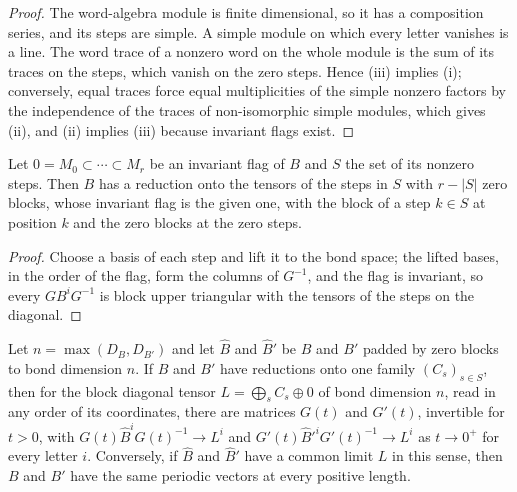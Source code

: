 \begin{proof}
    \leanok
    The word-algebra module is finite dimensional, so it has a composition
    series, and its steps are simple. A simple module on which every letter
    vanishes is a line. The word trace of a nonzero word on the whole module
    is the sum of its traces on the steps, which vanish on the zero steps.
    Hence (iii) implies (i); conversely, equal traces force equal
    multiplicities of the simple nonzero factors by the independence of
    the traces of non-isomorphic simple modules, which gives (ii), and (ii)
    implies (iii) because invariant flags exist.
\end{proof}

\begin{lemma}
    \label{thm:asym_arbitrary_flag_reduction}
    \leanok
    Let $0=M_0\subset\cdots\subset M_r$ be an invariant flag of $B$ and $S$
    the set of its nonzero steps. Then $B$ has a reduction onto the tensors of
    the steps in $S$ with $r-|S|$ zero blocks, whose invariant flag is the
    given one, with the block of a step $k\in S$ at position $k$ and the zero
    blocks at the zero steps.
\end{lemma}

\begin{proof}
    \leanok
    Choose a basis of each step and lift it to the bond space; the lifted
    bases, in the order of the flag, form the columns of $G^{-1}$, and the
    flag is invariant, so every $GB^iG^{-1}$ is block upper triangular with
    the tensors of the steps on the diagonal.
\end{proof}

\begin{lemma}
    \label{thm:asym_arbitrary_limit}
    \leanok
    Let $n=\max(D_B,D_{B'})$ and let $\widehat B$ and $\widehat B'$ be $B$
    and $B'$ padded by zero blocks to bond dimension $n$. If $B$ and $B'$
    have reductions onto one family $(C_s)_{s\in S}$, then for the block
    diagonal tensor $L=\bigoplus_sC_s\oplus0$ of bond dimension $n$, read in
    any order of its coordinates, there are matrices $G(t)$ and $G'(t)$,
    invertible for $t>0$, with
    $G(t)\widehat B^iG(t)^{-1}\to L^i$ and
    $G'(t)\widehat B'^iG'(t)^{-1}\to L^i$ as $t\to0^+$ for every letter $i$.
    Conversely, if $\widehat B$ and $\widehat B'$ have a common limit $L$ in
    this sense, then $B$ and $B'$ have the same periodic vectors at every
    positive length.
\end{lemma}

